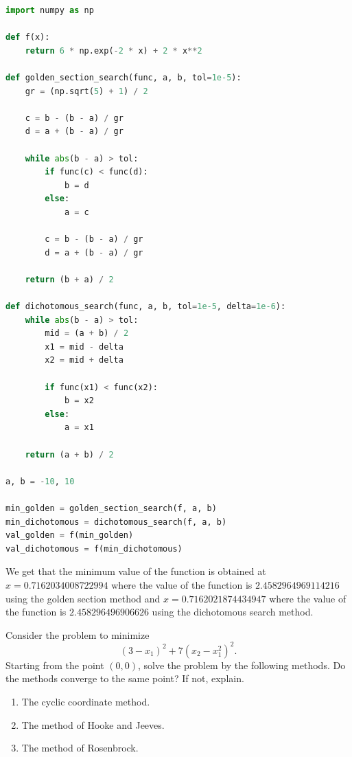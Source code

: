 \documentclass{article}
\begin{document}
\begin{lstlisting}[language=Python]
import numpy as np

def f(x):
    return 6 * np.exp(-2 * x) + 2 * x**2

def golden_section_search(func, a, b, tol=1e-5):
    gr = (np.sqrt(5) + 1) / 2

    c = b - (b - a) / gr
    d = a + (b - a) / gr

    while abs(b - a) > tol:
        if func(c) < func(d):
            b = d
        else:
            a = c

        c = b - (b - a) / gr
        d = a + (b - a) / gr

    return (b + a) / 2

def dichotomous_search(func, a, b, tol=1e-5, delta=1e-6):
    while abs(b - a) > tol:
        mid = (a + b) / 2
        x1 = mid - delta
        x2 = mid + delta

        if func(x1) < func(x2):
            b = x2
        else:
            a = x1

    return (a + b) / 2

a, b = -10, 10

min_golden = golden_section_search(f, a, b)
min_dichotomous = dichotomous_search(f, a, b)
val_golden = f(min_golden)
val_dichotomous = f(min_dichotomous)
\end{lstlisting}

We get that the minimum value of the function is obtained at $\boxed{x = 0.7162034008722994}$ where the value of the function is $\boxed{2.4582964969114216}$ using the golden section method and $\boxed{x = 0.7162021874434947}$ where the value of the function is $\boxed{2.458296496906626}$ using the dichotomous search method.

\clearpage

\begin{question*}[4]
    Consider the problem to minimize 
    \[
    (3 - x_1)^2 + 7(x_2 - x_1^2)^2.
    \]
    Starting from the point \((0,0)\), solve the problem by the following methods. Do the methods converge to the same point? If not, explain.

    \begin{enumerate}[label=\alph*.]
        \item The cyclic coordinate method.
        \item The method of Hooke and Jeeves.
        \item The method of Rosenbrock.
    \end{enumerate}

\end{question*}
\end{document}
